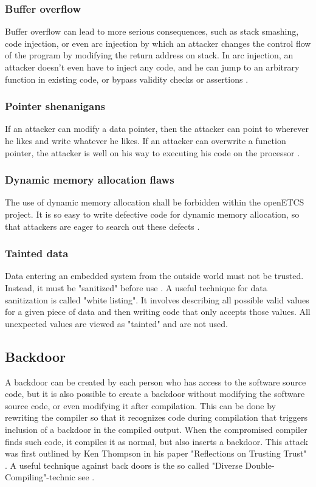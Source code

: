 \documentclass{template/openetcs_report}
\begin{document}
\subsubsection{Buffer overflow}
Buffer overflow can lead to more serious consequences, such as stack smashing, code injection, or even arc injection by which an attacker changes the control flow of the program by modifying the return address on stack. In arc injection, an attacker doesn't even have to inject any code, and he can jump to an arbitrary function in existing code, or bypass validity checks or assertions \cite{Kalinsky09}.

\subsubsection{Pointer shenanigans}
If an attacker can modify a data pointer, then the attacker can point to wherever he likes and write whatever he likes. If an attacker can overwrite a function pointer, the attacker is well on his way to executing his code on the processor \cite{Kalinsky09}.

\subsubsection{Dynamic memory allocation flaws}
The use of dynamic memory allocation shall be forbidden within the openETCS project. It is so easy to write defective code for dynamic memory allocation, so that attackers are eager to search out these defects \cite{Kalinsky09}.

\subsubsection{Tainted data}
Data entering an embedded system from the outside world must not be trusted. Instead, it must be "sanitized" before use \cite{Kalinsky09}.
A useful technique for data sanitization is called "white listing". It involves describing all possible valid values for a given piece of data and then writing code that only accepts those values. All unexpected values are viewed as "tainted" and are not used.

\subsection{Backdoor}
\label{Backdoor1}
A backdoor can be created by each person who has access to the software source code, but it is also possible to create a backdoor without modifying the software source code, or even modifying it after compilation. This can be done by rewriting the compiler so that it recognizes code during compilation that triggers inclusion of a backdoor in the compiled output. When the compromised compiler finds such code, it compiles it as normal, but also inserts a backdoor. This attack was first outlined by Ken Thompson in his paper "Reflections on Trusting Trust" \cite{Ken84}.
A useful technique against back doors is the so called "Diverse Double-Compiling"-technic see \cite{Wheeler09}. 
\end{document}
